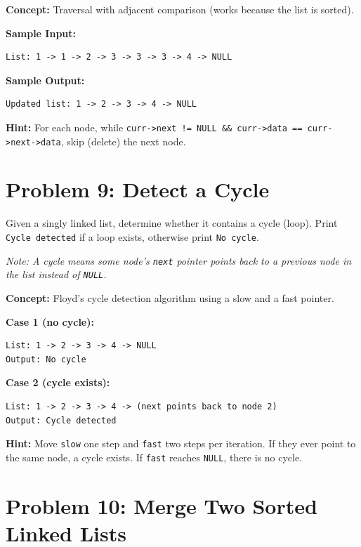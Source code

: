 \documentclass[12pt, a4paper]{article}
\begin{document}
\textbf{Concept:} Traversal with adjacent comparison (works because the list is sorted).

\textbf{Sample Input:}
\begin{lstlisting}
List: 1 -> 1 -> 2 -> 3 -> 3 -> 3 -> 4 -> NULL
\end{lstlisting}

\textbf{Sample Output:}
\begin{lstlisting}
Updated list: 1 -> 2 -> 3 -> 4 -> NULL
\end{lstlisting}

\textbf{Hint:} For each node, while \texttt{curr->next != NULL \&\& curr->data == curr->next->data}, skip (delete) the next node.

\hrulefill

\section*{Problem 9: Detect a Cycle}

\begin{problembox}
Given a singly linked list, determine whether it contains a cycle (loop). Print \texttt{Cycle detected} if a loop exists, otherwise print \texttt{No cycle}.

\smallskip
\textit{Note: A cycle means some node's \texttt{next} pointer points back to a previous node in the list instead of \texttt{NULL}.}
\end{problembox}

\textbf{Concept:} Floyd's cycle detection algorithm using a slow and a fast pointer.

\textbf{Case 1 (no cycle):}
\begin{lstlisting}
List: 1 -> 2 -> 3 -> 4 -> NULL
Output: No cycle
\end{lstlisting}

\textbf{Case 2 (cycle exists):}
\begin{lstlisting}
List: 1 -> 2 -> 3 -> 4 -> (next points back to node 2)
Output: Cycle detected
\end{lstlisting}

\textbf{Hint:} Move \texttt{slow} one step and \texttt{fast} two steps per iteration. If they ever point to the same node, a cycle exists. If \texttt{fast} reaches \texttt{NULL}, there is no cycle.

\newpage

\section*{Problem 10: Merge Two Sorted Linked Lists}
\end{document}
